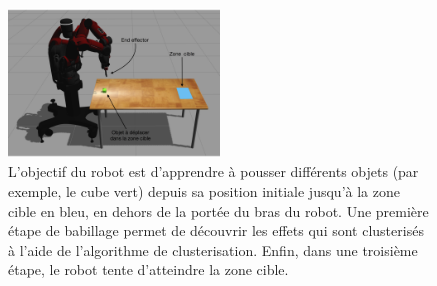 \documentclass[draft]{llncs}
\begin{document}

\begin{figure}[ht]
  \begin{center}
    \includegraphics[width=0.5\textwidth]{figures/Experiment_setup_annoted_FR.png}
    \caption{L'objectif du robot est d'apprendre à pousser différents objets (par exemple, le cube vert) depuis sa position initiale jusqu'à la zone cible en bleu, en dehors de la portée du bras du robot. Une première étape de babillage permet de découvrir les effets qui sont clusterisés à l'aide de l'algorithme de clusterisation. Enfin, dans une troisième étape, le robot tente d'atteindre la zone cible.}
    \label{fig:setup}
  \end{center}
\end{figure}
\end{document}
